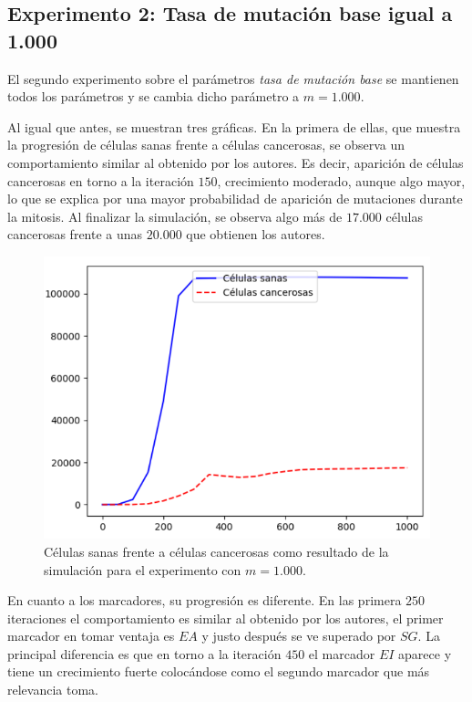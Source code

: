 \subsection{Experimento 2: Tasa de mutación base igual a 1.000}

El segundo experimento sobre el parámetros \textit{tasa de mutación base} se
mantienen todos los parámetros y se cambia dicho parámetro a $m=1.000$.

Al igual que antes, se muestran tres gráficas. En la primera de ellas, que muestra la progresión de
células sanas frente a células cancerosas, se observa un comportamiento similar al obtenido
por los autores. Es decir, aparición de células cancerosas en torno a la iteración $150$,
crecimiento moderado, aunque algo mayor, lo que se explica por una mayor
probabilidad de aparición de mutaciones durante la mitosis. Al finalizar la simulación, se
observa algo más de $17.000$ células cancerosas frente a unas $20.000$ que obtienen los autores.

\begin{figure}[h]
\centering
\includegraphics[scale=0.8]{figures/experiments/exp2/healthvscarcino}
\caption{Células sanas frente a células cancerosas como resultado de la simulación para el experimento con $m = 1.000$.}
\end{figure}

En cuanto a los marcadores, su progresión es diferente. En las primera $250$ iteraciones
el comportamiento es similar al obtenido por los autores, el primer marcador en tomar ventaja es
$EA$ y justo después se ve superado por $SG$. La principal diferencia es que en torno a la iteración $450$
el marcador $EI$ aparece y tiene un crecimiento fuerte colocándose como el segundo marcador que más relevancia
toma.

